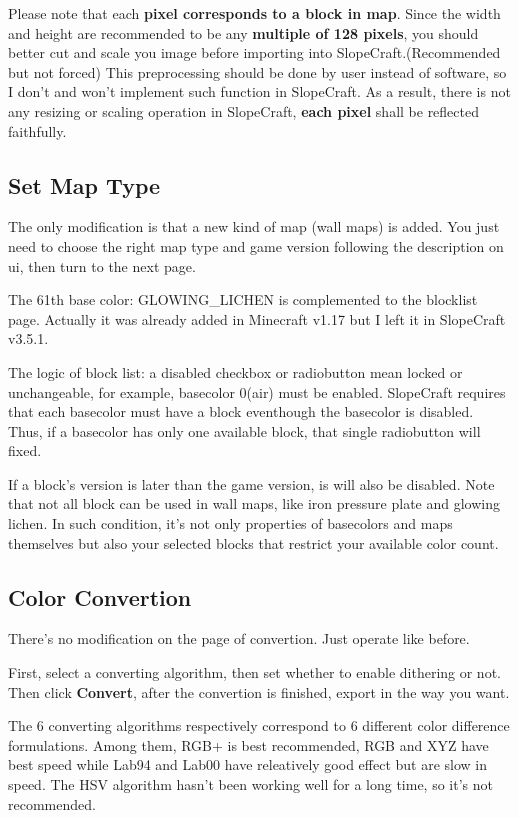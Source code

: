 \documentclass{article}
\begin{document}
    Please note that each \textbf{pixel corresponds to a block in map}. Since the width and height are recommended to be any \textbf{multiple of 128 pixels}, you should better cut and scale you image before importing into SlopeCraft.(Recommended but not forced) This preprocessing should be done by user instead of software, so I don't and won't implement such function in SlopeCraft. As a result, there is not any resizing or scaling operation in SlopeCraft, \textbf{each pixel} shall be reflected faithfully.

    \subsection{Set Map Type}
    The only modification is that a new kind of map (wall maps) is added. You just need to choose the right map type and game version following the description on ui, then turn to the next page.

    The 61th base color: GLOWING\_LICHEN is complemented to the blocklist page. Actually it was already added in Minecraft v1.17 but I left it in SlopeCraft v3.5.1.

    The logic of block list: a disabled checkbox or radiobutton mean locked or unchangeable, for example, basecolor 0(air) must be enabled. SlopeCraft requires that each basecolor must have a block eventhough the basecolor is disabled. Thus, if a basecolor has only one available block, that single radiobutton will fixed.
    
    If a block's version is later than the game version, is will also be disabled. Note that not all block can be used in wall maps, like iron pressure plate and glowing lichen. In such condition, it's not only properties of basecolors and maps themselves but also your selected blocks that restrict your available color count.

    \subsection{Color Convertion}
    There's no modification on the page of convertion. Just operate like before.
    
    First, select a converting algorithm, then set whether to enable dithering or not. Then click \textbf{Convert}, after the convertion is finished, export in the way you want.

    The 6 converting algorithms respectively correspond to 6 different color difference formulations. Among them, RGB+ is best recommended, RGB and XYZ have best speed while Lab94 and Lab00 have releatively good effect but are slow in speed. The HSV algorithm hasn't been working well for a long time, so it's not recommended.
    
\end{document}
